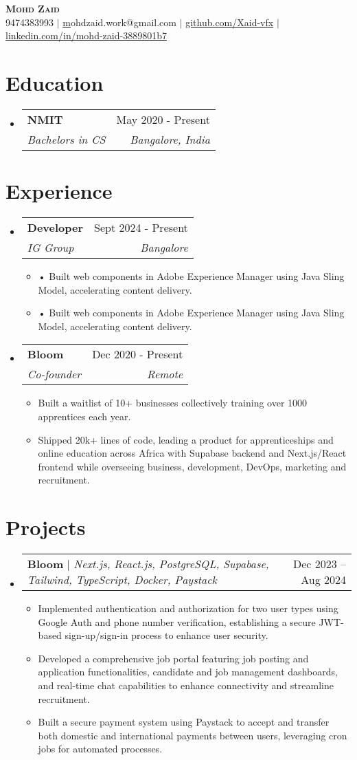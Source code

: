\documentclass[letterpaper,11pt]{article}
\makeatletter
\newcommand{\resumeItem}[1]{
  \item\small{
    {#1 \vspace{-2pt}}
  }
}
\newcommand{\resumeSubheading}[4]{
  \vspace{-2pt}\item
    \begin{tabular*}{0.97\textwidth}[t]{l@{\extracolsep{\fill}}r}
      \textbf{#1} & #2 \\
      \textit{\small#3} & \textit{\small #4} \\
    \end{tabular*}\vspace{-7pt}
}
\newcommand{\resumeProjectHeading}[2]{
    \item
    \begin{tabular*}{0.97\textwidth}{l@{\extracolsep{\fill}}r}
      \small#1 & #2 \\
    \end{tabular*}\vspace{-7pt}
}
\newcommand{\resumeSubHeadingListStart}{\begin{itemize}[leftmargin=0.15in, label={}]}
\newcommand{\resumeSubHeadingListEnd}{\end{itemize}}
\newcommand{\resumeItemListStart}{\begin{itemize}}
\newcommand{\resumeItemListEnd}{\end{itemize}\vspace{-5pt}}
\makeatother
\begin{document}
\begin{center}
    \textbf{\Huge \scshape Mohd Zaid} \\ \vspace{1pt}
    \small 
    9474383993
     $|$ 
    \href{https://mailto:mohdzaid.work@gmail.com}mohdzaid.work@gmail.com
     $|$ 
    \href{https://github.com/Xaid-vfx}{github.com/Xaid-vfx}
     $|$ 
    \href{https://linkedin.com/in/mohd-zaid-3889801b7}{linkedin.com/in/mohd-zaid-3889801b7}
\end{center}

\section{Education}
\resumeSubHeadingListStart
\resumeSubheading
{ NMIT }{ May 2020 -  Present }
{ Bachelors in CS }{ Bangalore, India }
\resumeSubHeadingListEnd

\section{Experience}
\resumeSubHeadingListStart
\resumeSubheading
{ Developer }{ Sept 2024 - Present }
{ IG Group }{ Bangalore }
\resumeItemListStart
\resumeItem{ • Built web components in Adobe Experience Manager using Java Sling Model, accelerating content delivery. }
\resumeItem{ • Built web components in Adobe Experience Manager using Java Sling Model, accelerating content delivery. }
\resumeItemListEnd
\resumeSubheading
{ Bloom }{ Dec 2020 - Present }
{ Co-founder }{ Remote }
\resumeItemListStart
\resumeItem{ Built a waitlist of 10+ businesses collectively training over 1000 apprentices each year. }
\resumeItem{ Shipped 20k+ lines of code, leading a product for apprenticeships and online education across Africa with Supabase backend and Next.js/React frontend while overseeing business, development, DevOps, marketing and recruitment. }
\resumeItemListEnd
\resumeSubHeadingListEnd

\section{Projects}
\resumeSubHeadingListStart
\resumeProjectHeading
{\textbf{ Bloom } $|$ \emph{ Next.js, React.js, PostgreSQL, Supabase, Tailwind, TypeScript, Docker, Paystack  }}{ Dec 2023 – Aug 2024 }
\resumeItemListStart
\resumeItem{ Implemented authentication and authorization for two user types using Google Auth and phone number verification, establishing a secure JWT-based sign-up/sign-in process to enhance user security. }
\resumeItem{ Developed a comprehensive job portal featuring job posting and application functionalities, candidate and job management dashboards, and real-time chat capabilities to enhance connectivity and streamline recruitment. }
\resumeItem{ Built a secure payment system using Paystack to accept and transfer both domestic and international payments between users, leveraging cron jobs for automated processes. }
\resumeItemListEnd
\resumeSubHeadingListEnd
\end{document}
